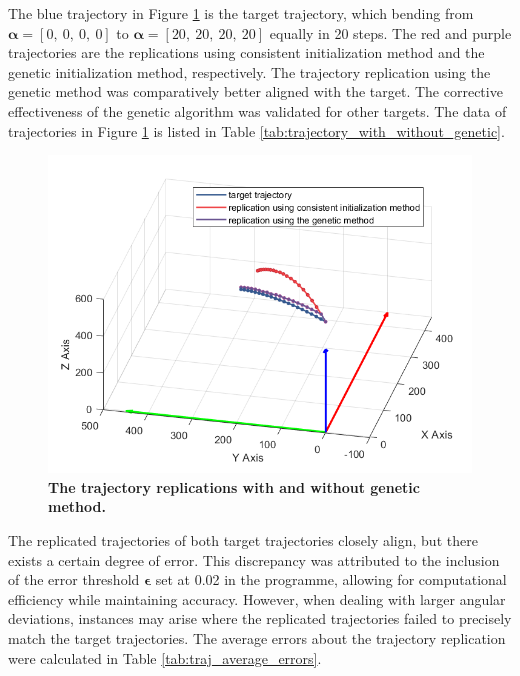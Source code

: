 The blue trajectory in Figure \ref{fig:genetic_approach} is the target trajectory, which bending from 
$\boldsymbol{\alpha} = [0,\ 0,\ 0,\ 0]$ to $\boldsymbol{\alpha} = [20,\ 20,\ 20,\ 20]$ equally in 20 steps. 
The red and purple trajectories are the replications using consistent initialization method and the genetic 
initialization method, respectively. The trajectory replication using the genetic method was comparatively better 
aligned with the target. The corrective effectiveness of the genetic algorithm was validated for 
other targets. The data of trajectories in Figure \ref{fig:genetic_approach} is listed in Table 
\ref{tab:trajectory_with_without_genetic}.
\begin{figure}[H] %
    \centering 
    \captionsetup{labelsep=colon}
    \includegraphics[width=1.0\textwidth]{Image/Result/trajectory_replication_diff_initialization.png} 
    \caption[The trajectory replications with and without genetic method]
    {\centering \textbf{The trajectory replications with and without genetic method.}}
    \label{fig:genetic_approach}
\end{figure}
\vspace{-5mm}
The replicated trajectories of both target trajectories closely align, but there exists a certain degree of error. 
This discrepancy was attributed to the inclusion of the error threshold $\boldsymbol{\epsilon}$ set at 0.02 in the 
programme, allowing for computational efficiency while maintaining accuracy. However, when dealing with  
larger angular deviations, instances may arise where the replicated trajectories failed to precisely match the 
target trajectories. The average errors about the trajectory replication were calculated in Table \ref{tab:traj_average_errors}.
